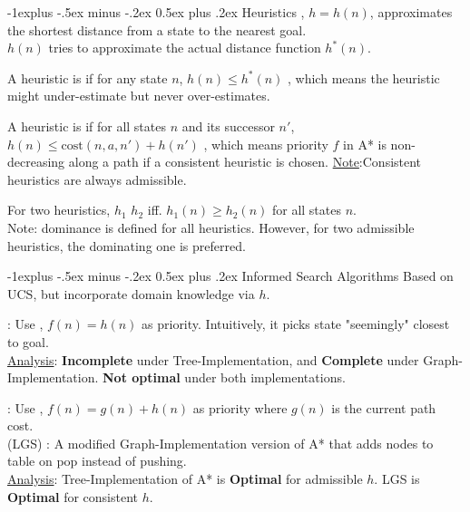 \documentclass[10pt,landscape,letterpaper]{article}
\makeatletter
\renewcommand{\subsection}{\@startsection{subsection}{2}{0mm}%
                                {-1explus -.5ex minus -.2ex}%
                                {0.5ex plus .2ex}%
                                {\sffamily\normalsize\itshape}}
\makeatother
\begin{document}
\begin{multicols}{3}
\subsection{Heuristics}
, $h = h(n)$, approximates the shortest distance from a state to the nearest goal.\\
$h(n)$ tries to approximate the actual distance function $h^*(n)$.
\smallskip

A heuristic is  if for any state $n$, $ h(n) \leq h^{*}(n) $ , which means the heuristic might under-estimate but never over-estimates.
\smallskip

A heuristic is  if for all states $n$ and its successor $n'$, $h(n) \leq \text{cost}(n, a, n') + h(n')$ , which means priority $f$ in A* is non-decreasing along a path if a consistent heuristic is chosen. \underline{Note}:Consistent heuristics are always admissible.

\smallskip

For two heuristics, $h_1$  $h_2$ iff. $h_1(n) \geq h_2(n)$ for all states $n$. \\
Note: dominance is defined for all heuristics. However, for two admissible heuristics, the dominating one is preferred.




\subsection{Informed Search Algorithms}
Based on UCS, but incorporate domain knowledge via $h$.

\smallskip

 : Use , $f(n) = h(n)$ as priority. Intuitively, it picks state "seemingly" closest to goal.
\\
\underline{Analysis}: \textbf{Incomplete} under Tree-Implementation, and \textbf{Complete} under Graph-Implementation. \textbf{Not optimal} under both implementations.

\smallskip

 : Use , $f(n) = g(n) + h(n)$ as priority where $g(n)$ is the current path cost.
\\
 (LGS) : A modified Graph-Implementation version of A* that adds nodes to  table on pop instead of pushing.
\\
\underline{Analysis}: Tree-Implementation of A* is \textbf{Optimal} for admissible $h$. LGS is \textbf{Optimal} for consistent $h$.





\end{multicols}
\end{document}
